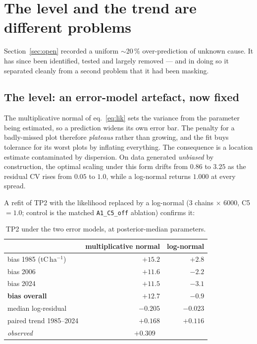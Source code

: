 \documentclass[11pt]{article}
\begin{document}
\section{The level and the trend are different problems}\label{sec:leveltrend}

Section~\ref{sec:open} recorded a uniform $\sim$20\,\% over-prediction of unknown cause. It has
since been identified, tested and largely removed --- and in doing so it separated cleanly from a
second problem that it had been masking.

\subsection{The level: an error-model artefact, now fixed}

The multiplicative normal of eq.~\eqref{eq:lik} sets the variance from the parameter being
estimated, so a prediction widens its own error bar. The penalty for a badly-missed plot
therefore \emph{plateaus} rather than growing, and the fit buys tolerance for its worst plots by
inflating everything. The consequence is a location estimate contaminated by dispersion. On data
generated \emph{unbiased} by construction, the optimal scaling under this form drifts from $0.86$
to $3.25$ as the residual CV rises from $0.05$ to $1.0$, while a log-normal returns $1.000$ at
every spread.

A refit of TP2 with the likelihood replaced by a log-normal (3 chains $\times$ 6000, C5 $=1.0$;
control is the matched \texttt{A1\_C5\_off} ablation) confirms it:

\begin{table}[H]\centering\small
\caption{TP2 under the two error models, at posterior-median parameters.}
\begin{tabular}{lrr}
\toprule
 & multiplicative normal & log-normal\\
\midrule
bias 1985 (tC\,ha$^{-1}$) & $+15.2$ & $+2.8$\\
bias 2006 & $+11.6$ & $-2.2$\\
bias 2024 & $+11.5$ & $-3.1$\\
\textbf{bias overall} & $\mathbf{+12.7}$ & $\mathbf{-0.9}$\\
median log-residual & $-0.205$ & $-0.023$\\
\midrule
paired trend 1985--2024 & $+0.168$ & $+0.116$\\
\emph{observed} & \multicolumn{2}{c}{$+0.309$}\\
\bottomrule
\end{tabular}
\end{table}
\end{document}
